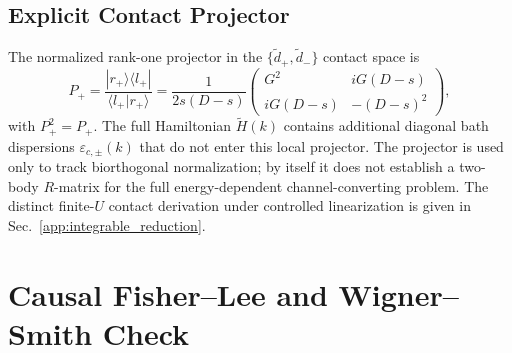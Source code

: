 \documentclass[%
  aps,physrev,onecolumn,10pt,amsmath,amssymb,superscriptaddress,longbibliography,floatfix
]{revtex4-2}
\newcommand{\Htilde}{\tilde{H}}
\begin{document}
\subsection{Explicit Contact Projector}

The normalized rank-one projector in the $\{\tilde d_+,\tilde d_-\}$
contact space is
\begin{equation}
P_+=\frac{|r_+\rangle\langle l_+|}{\langle l_+|r_+\rangle}
=\frac{1}{2s(D-s)}
\begin{pmatrix}
G^2 & iG(D-s)\\
iG(D-s) & -(D-s)^2
\end{pmatrix},
\label{eq:Pplus_contact}
\end{equation}
with $P_+^2=P_+$.
The full Hamiltonian $\Htilde(k)$ contains additional diagonal bath
dispersions $\varepsilon_{c,\pm}(k)$ that do not enter this local
projector.  The projector is used only to track biorthogonal normalization;
by itself it does not establish a two-body $R$-matrix for the full
energy-dependent channel-converting problem.  The distinct finite-\(U\)
contact derivation under controlled linearization is given in
Sec.~\ref{app:integrable_reduction}.

\section{Causal Fisher--Lee and Wigner--Smith Check}
\label{app:smith}
\end{document}
